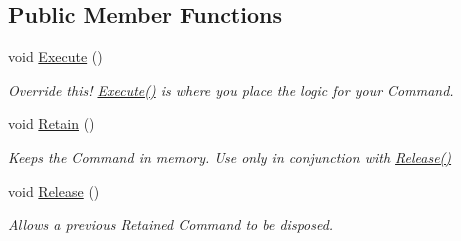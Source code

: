 \subsection*{Public Member Functions}
\begin{DoxyCompactItemize}
\item 
\hypertarget{interfacestrange_1_1extensions_1_1command_1_1api_1_1_i_command_a49ddf3bbaf19624534fa99fa4725feca}{void \hyperlink{interfacestrange_1_1extensions_1_1command_1_1api_1_1_i_command_a49ddf3bbaf19624534fa99fa4725feca}{Execute} ()}\label{interfacestrange_1_1extensions_1_1command_1_1api_1_1_i_command_a49ddf3bbaf19624534fa99fa4725feca}

\begin{DoxyCompactList}\small\item\em Override this! {\ttfamily \hyperlink{interfacestrange_1_1extensions_1_1command_1_1api_1_1_i_command_a49ddf3bbaf19624534fa99fa4725feca}{Execute()}} is where you place the logic for your Command. \end{DoxyCompactList}\item 
\hypertarget{interfacestrange_1_1extensions_1_1command_1_1api_1_1_i_command_ae24532aa617e2bee62a3798b59b78458}{void \hyperlink{interfacestrange_1_1extensions_1_1command_1_1api_1_1_i_command_ae24532aa617e2bee62a3798b59b78458}{Retain} ()}\label{interfacestrange_1_1extensions_1_1command_1_1api_1_1_i_command_ae24532aa617e2bee62a3798b59b78458}

\begin{DoxyCompactList}\small\item\em Keeps the Command in memory. Use only in conjunction with {\ttfamily \hyperlink{interfacestrange_1_1extensions_1_1command_1_1api_1_1_i_command_a462054fd8e17e6139f9739e32d4d6ced}{Release()}} \end{DoxyCompactList}\item 
\hypertarget{interfacestrange_1_1extensions_1_1command_1_1api_1_1_i_command_a462054fd8e17e6139f9739e32d4d6ced}{void \hyperlink{interfacestrange_1_1extensions_1_1command_1_1api_1_1_i_command_a462054fd8e17e6139f9739e32d4d6ced}{Release} ()}\label{interfacestrange_1_1extensions_1_1command_1_1api_1_1_i_command_a462054fd8e17e6139f9739e32d4d6ced}

\begin{DoxyCompactList}\small\item\em Allows a previous Retained Command to be disposed. \end{DoxyCompactList}\end{DoxyCompactItemize}
